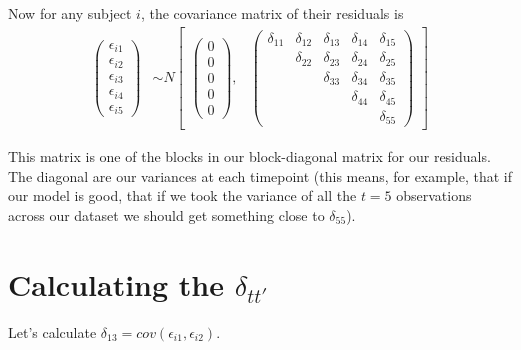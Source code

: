 \documentclass[
  letterpaper,
  DIV=11,
  numbers=noendperiod]{scrreprt}
\begin{document}
Now for any subject \(i\), the covariance matrix of their residuals is
\[\begin{aligned}
\begin{pmatrix} \epsilon_{i1} \\
\epsilon_{i2} \\
\epsilon_{i3} \\
\epsilon_{i4} \\
\epsilon_{i5}
\end{pmatrix} &\sim  N
\begin{bmatrix}
\begin{pmatrix}
0 \\
0 \\
0\\
0 \\
0
\end{pmatrix}\!\!,&
\begin{pmatrix}
\delta_{11} & \delta_{12} & \delta_{13} & \delta_{14} & \delta_{15} \\
           & \delta_{22} & \delta_{23} & \delta_{24} & \delta_{25} \\
         &              & \delta_{33} & \delta_{34} & \delta_{35} \\
         &              &             & \delta_{44} & \delta_{45} \\
         &              &              &            & \delta_{55} 
\end{pmatrix}
\end{bmatrix}
\end{aligned}\]

This matrix is one of the blocks in our block-diagonal matrix for our
residuals. The diagonal are our variances at each timepoint (this means,
for example, that if our model is good, that if we took the variance of
all the \(t=5\) observations across our dataset we should get something
close to \(\delta_{55}\)).

\hypertarget{calculating-the-delta_tt}{%
\section*{\texorpdfstring{Calculating the
\(\delta_{tt'}\)}{Calculating the \textbackslash delta\_\{tt\textquotesingle\}}}\label{calculating-the-delta_tt}}


Let's calculate \(\delta_{13} = cov( \epsilon_{i1}, \epsilon_{i2} )\).
\end{document}
